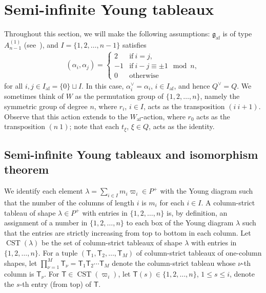 \documentclass[10pt]{amsart}
\theoremstyle{definition}\newtheorem{defi}[theo]{Definition}
\theoremstyle{remark}\newtheorem{rema}[theo]{Remark}
\newcommand{\Fg}{\mathfrak{g}}
\DeclareMathOperator{\af}{af}
\DeclareMathOperator{\CST}{CST}
\begin{document}
\section{Semi-infinite Young tableaux} \label{Section:SiYT}

Throughout this section, 
we will make the following assumptions: 
$\Fg_{\af}$ 
is of type 
$A_{n-1}^{(1)}$
(see~\cite[\S~4.8 TABLE Aff1]{Kac}), 
and 
$I = \{ 1, 2, \ldots ,n-1 \}$ 
satisfies 
\begin{align}
(\alpha_i , \alpha_j)
=
\begin{cases}
2 & \text{if} \ i=j, \\
-1 & \text{if} \ i-j \equiv \pm 1 \mod n, \\
0 & \text{otherwise}
\end{cases}
\end{align}
for all $i , j \in I_{\af} = \{ 0 \} \sqcup I$. 
In this case, 
$\alpha_i^{\vee} = \alpha_i$, $i \in I_{\af}$, 
and hence 
$Q^{\vee} = Q$.
We sometimes think of $W$ as the permutation group of 
$\{ 1, 2, \ldots ,n \}$, namely the symmetric group of degree $n$, 
where $r_i$, $i \in I$, acts as the transposition $(i \ i+1)$. 
Observe that this action extends to the $W_{\af}$-action, 
where 
$r_0$ 
acts as the transposition $(n \ 1)$; 
note that each 
$t_{\xi}$, $\xi \in Q$, 
acts as the identity. 

\subsection{Semi-infinite Young tableaux and isomorphism theorem} \label{subsection:SiYT}

We identify each element $\lambda = \sum_{i \in I} m_i \varpi_i \in P^+$ 
with the Young diagram such that the number of the columns of length $i$ is $m_i$ for each $i \in I$. 
A column-strict tableau of shape 
$\lambda \in P^+$ 
with entries in 
$\{ 1,2,\ldots ,n \}$
is, by definition, an assignment of a number in 
$\{ 1,2,\ldots ,n \}$
to each box of the Young diagram 
$\lambda$
such that the entries are strictly increasing 
from top to bottom in each column.
Let $\CST (\lambda)$ 
be the set of column-strict tableaux of shape $\lambda$ 
with entries in $\{ 1,2, \ldots ,n \}$. 
For a tuple 
$(\mathsf{T}_1 , \mathsf{T}_2 , \ldots , \mathsf{T}_M)$
of column-strict tableaux of one-column shapes, let 
$\prod_{\nu = 1}^M \mathsf{T}_{\nu}
= \mathsf{T}_1 \mathsf{T}_2 \cdots \mathsf{T}_M$
denote the column-strict tableau whose $\nu$-th column is 
$\mathsf{T}_{\nu}$. 
For $\mathsf{T} \in \CST (\varpi_i)$, 
let 
$\mathsf{T}(s) \in \{ 1,2,\ldots , n \}$, $1 \leq s \leq i$, 
denote the $s$-th entry (from top) of 
$\mathsf{T}$. 
\end{document}
